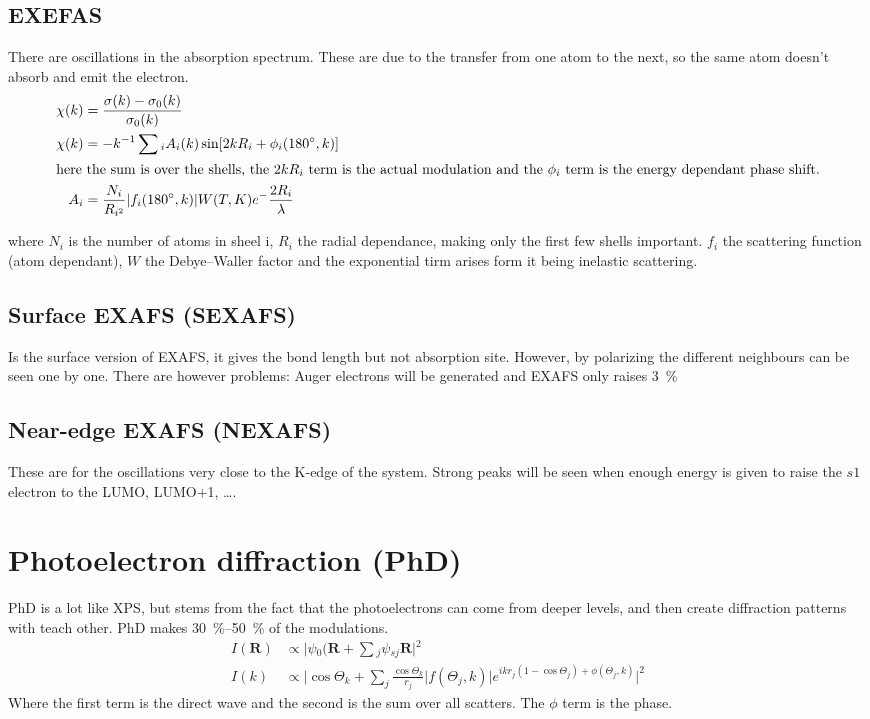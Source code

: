 \documentclass[article,oneside]{memoir}
\begin{document}
\section{EXEFAS}
There are oscillations in the absorption spectrum. These are due to the transfer from one atom to the next, so the same atom doesn't absorb and emit the electron.
\begin{align*}
        \chi(k)&=\frac{\sigma(k)-\sigma_{0}(k)}{\sigma_{0}(k)}\\
        \chi{}(k)&=-k^{-1}\sum{}_{i}A_{i}(k)\sin[2kR_{i}+\phi_{i}(180^\circ{},k)]\\
        \intertext{here the sum is over the shells, the $2kR_{i}$ term is the actual modulation and  the $\phi_{i}$ term is the energy dependant phase shift.}
        A_{i}&=\frac{N_i}{R_{i^2}}\lvert f_{i}(180^\circ,k)\rvert W(T,K)e^-\frac{2R_{i}}{\lambda}
\end{align*}

where $N_{i}$ is the number of atoms in sheel i, $R_{i}$ the radial dependance, making only the first few shells important. $f_{i}$ the scattering function (atom dependant), $W$ the Debye--Waller factor and the exponential tirm arises form it being inelastic scattering.
\section{Surface EXAFS (SEXAFS)}
Is the surface version of EXAFS, it gives the bond length but not absorption site. However, by polarizing the different neighbours can be seen one by one. There are however problems: Auger electrons will be generated and EXAFS only raises \SI{3}{\percent} 
\section{Near-edge EXAFS (NEXAFS)}
These are for the oscillations very close to the K-edge of the system. Strong peaks will be seen when enough energy is given to raise the $s1$ electron to the LUMO, LUMO+1, \dots.
\chapter{Photoelectron diffraction (PhD)}
PhD is a lot like XPS, but stems from the fact that the photoelectrons can come from deeper levels, and then create diffraction patterns with teach other. PhD makes \SIrange{30}{50}{\percent} of the modulations.
\begin{align*}
        I(\mathbf{R})&\propto{}\lvert{}\psi{}_{0}(\mathbf{R}+\sum{}_{j}\psi{}_{sj}\mathbf{R}\rvert{}^2\\
        I(k)&\propto\big\lvert\cos\Theta_{k}+\sum_j \frac{\cos\Theta_k}{r_{j}}\lvert f(\Theta_j,k)\rvert e^{ikr_{j}(1-\cos\Theta_j)+\phi(\Theta_j,k)}\big\rvert^2
\end{align*}
Where the first term is the direct wave and the second is the sum over all scatters. The $\phi$ term is the phase.
\end{document}
